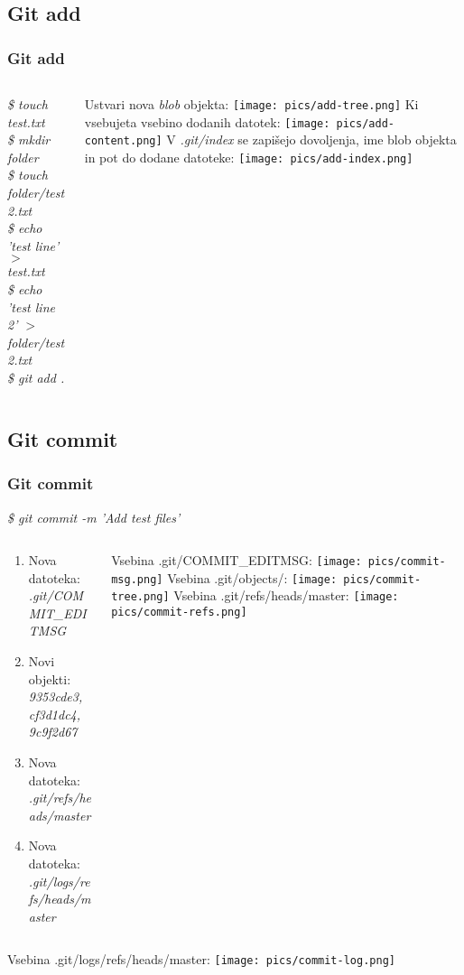\documentclass{beamer}
\begin{document}
\subsection{Git add}
\begin{frame}
  \frametitle{Git add}
  \begin{columns}[c]
    \begin{column}{.5\textwidth}
      \emph{\$ touch test.txt}\\
      \emph{\$ mkdir folder}\\
      \emph{\$ touch folder/test2.txt}\\
      \emph{\$ echo 'test line' $>$ test.txt}\\
      \emph{\$ echo 'test line 2' $>$ folder/test2.txt}\\
      \emph{\$ git add .}
    \end{column}
    \begin{column}{.5\textwidth}
      Ustvari nova \emph{blob} objekta:
      \texttt{[image: pics/add-tree.png]}
      Ki vsebujeta vsebino dodanih datotek:
      \texttt{[image: pics/add-content.png]}
      V \emph{.git/index} se zapišejo dovoljenja, ime blob objekta in pot do
      dodane datoteke:
      \texttt{[image: pics/add-index.png]}
    \end{column}
  \end{columns}
\end{frame}

\subsection{Git commit}
\begin{frame}
  \frametitle{Git commit}
  \emph{\$ git commit -m 'Add test files'}
  \begin{columns}[c]
    \begin{column}{.5\textwidth}
      \begin{enumerate}
        \item Nova datoteka: \emph{.git/COMMIT\_EDITMSG}
        \item Novi objekti: \emph{9353cde3, cf3d1dc4, 9c9f2d67}
        \item Nova datoteka: \emph{.git/refs/heads/master}
        \item Nova datoteka: \emph{.git/logs/refs/heads/master}
      \end{enumerate}
    \end{column}
    \begin{column}{.5\textwidth}
      Vsebina .git/COMMIT\_EDITMSG:
      \texttt{[image: pics/commit-msg.png]}
      Vsebina .git/objects/:
      \texttt{[image: pics/commit-tree.png]}
      Vsebina .git/refs/heads/master:
      \texttt{[image: pics/commit-refs.png]}
    \end{column}
  \end{columns}
  Vsebina .git/logs/refs/heads/master:
  \texttt{[image: pics/commit-log.png]}
\end{frame}
\end{document}
